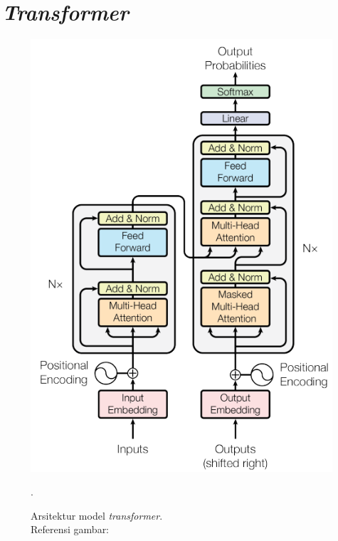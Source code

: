 \section{\emph{Transformer}}

\begin{figure}[h]
\includegraphics[scale=0.5]{assets/pics/transformer-achitecture.png}
\centering
\caption{Arsitektur model \emph{transformer}.\\\hspace{\textwidth}Referensi gambar: \citep{DBLP:journals/corr/VaswaniSPUJGKP17}}.
\end{figure}

